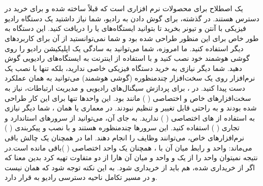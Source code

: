 \documentclass[landscape, 12pt]{report}
\begin{document}
    
\section*{}
یک اصطلاح برای محصولات نرم افزاری است که قبلاً ساخته شده و برای خرید در دسترس هستند. در گذشته، برای گوش دادن به رادیو، شما نیاز داشتید یک دستگاه رادیو فیزیکی با آنتن و تیونر بخرید تا بتوانید ایستگاه‌های
  یا
    را دریافت کنید. این دستگاه به طور خاص برای این منظور طراحی شده بود و شما نمی‌توانستید از آن برای کاربردهای دیگر استفاده کنید. ما امروزه، شما می‌توانید به سادگی یک اپلیکیشن رادیو را روی گوشی هوشمند خود نصب کنید و با استفاده از اینترنت به ایستگاه‌های رادیویی گوش دهید. شما دیگر نیازی به خرید دستگاه فیزیکی خاصی ندارید، بلکه تنها با نصب یک نرم‌افزار روی یک سخت‌افزار چندمنظوره (گوشی هوشمند) می‌توانید به همان عملکرد دست پیدا کنید. در 
    ، برای پردازش سیگنال‌های رادیویی و مدیریت ارتباطات، نیاز به سخت‌افزارهای خاص و اختصاصی
    (
  ) مانند 
   بود. این واحدها تنها برای این کار طراحی شده بودند و به راحتی قابل تغییر و تنظیم نبودند. در معماری
     یا همان
     ، شما دیگر نیازی به استفاده از
      های اختصاصی (
    ) ندارید. به جای آن، می‌توانید از سرورهای استاندارد و تجاری (
    ) استفاده کنید. این سرورها چندمنظوره هستند و با نصب و پیکربندی  (
    ) نرم‌افزارهای خاص، می‌توانند وظایف
     را انجام دهند. اما در
       همچنان یک چالش باقی می‌ماند: واحد
          و رابط میان آن با
            ، همچنان یک واحد اختصاصی (
            )باقی مانده است.در نتیجه نمیتوان واحد 
             را از یک
              و  واحد 
               و 
                 میان آن ‌هارا از دو
                   متفاوت تهیه کرد بدین معنا که اگر
                    از 
                     خریداری شده،
                       هم باید از
                         خریداری شود. به این نکته توجه شود که
                           همان
                             نیست و در مسیر تکامل ناحیه دسترسی رادیو به
                               قرار دارد.
\end{document}
